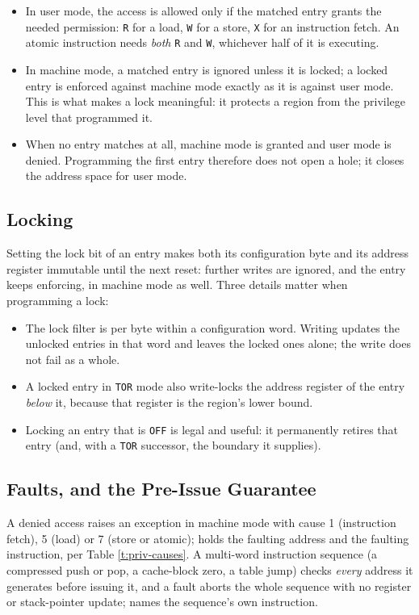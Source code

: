 \begin{itemize}
	\item In user mode, the access is allowed only if the matched entry grants the needed permission: \texttt{R} for a load, \texttt{W} for a store, \texttt{X} for an instruction fetch. An atomic instruction needs \textit{both} \texttt{R} and \texttt{W}, whichever half of it is executing.
	\item In machine mode, a matched entry is ignored unless it is locked; a locked entry is enforced against machine mode exactly as it is against user mode. This is what makes a lock meaningful: it protects a region from the privilege level that programmed it.
	\item When no entry matches at all, machine mode is granted and user mode is denied. Programming the first entry therefore does not open a hole; it closes the address space for user mode.
\end{itemize}

\subsection{Locking}

Setting the lock bit of an entry makes both its configuration byte and its address register immutable until the next reset: further writes are ignored, and the entry keeps enforcing, in machine mode as well. Three details matter when programming a lock:

\begin{itemize}
	\item The lock filter is per byte within a configuration word. Writing  updates the unlocked entries in that word and leaves the locked ones alone; the write does not fail as a whole.
	\item A locked entry in \texttt{TOR} mode also write-locks the address register of the entry \textit{below} it, because that register is the region's lower bound.
	\item Locking an entry that is \texttt{OFF} is legal and useful: it permanently retires that entry (and, with a \texttt{TOR} successor, the boundary it supplies).
\end{itemize}

\subsection{Faults, and the Pre-Issue Guarantee}

A denied access raises an exception in machine mode with cause 1 (instruction fetch), 5 (load) or 7 (store or atomic);  holds the faulting address and  the faulting instruction, per Table \ref{t:priv-causes}. A multi-word instruction sequence (a compressed push or pop, a cache-block zero, a table jump) checks \textit{every} address it generates before issuing it, and a fault aborts the whole sequence with no register or stack-pointer update;  names the sequence's own instruction.

